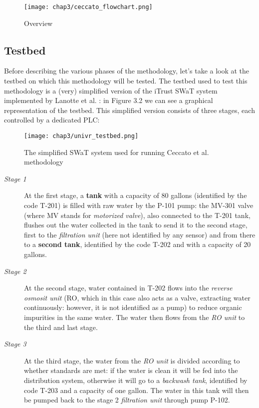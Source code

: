 \begin{figure}[ht]
	\centering
	\texttt{[image: chap3/ceccato\_flowchart.png]}
	\caption{Overview}
	\label{fig:ceccato_overview}
\end{figure}

\subsection{Testbed}
\label{subsec:ceccato_testbed}
Before describing the various phases of the methodology, let's take a look at the testbed on which this methodology will be tested. The testbed used to test this methodology is a (very) simplified version of the iTrust SWaT system \cite{swat_home} implemented by Lanotte et al. \cite{lanotte_et_al}: in Figure 3.2 we can see a graphical representation of the testbed. This simplified version consists of three stages, each controlled by a dedicated PLC: 

\begin{figure}[ht]
	\centering
	\texttt{[image: chap3/univr\_testbed.png]}
	\caption{The simplified SWaT system used for running Ceccato et al. methodology}
	\label{fig:univr_testbed}
\end{figure}

\bigskip
\begin{description}
	\item[\textit{Stage 1}] At the first stage, a \textbf{tank} with a capacity of 80 gallons (identified by the code T-201) is filled with raw water by the P-101 pump: the MV-301 valve (where MV stands for \textit{motorized valve}), also connected to the T-201 tank, flushes out the water collected in the tank to send it to the second stage, first to the \textit{filtration unit} (here not identified by any sensor) and from there to a \textbf{second tank}, identified by the code T-202 and with a capacity of 20 gallons.
	
	\item[\textit{Stage 2}] At the second stage, water contained in T-202 flows into the \textit{reverse osmosit unit} (RO, which in this case also acts as a valve, extracting water continuously: however, it is not identified as a pump) to reduce organic impurities in the same water. The water then flows from the \textit{RO unit} to the third and last stage.
	
	\item[\textit{Stage 3}] At the third stage, the water from the \textit{RO unit} is divided according to whether standards are met: if the water is clean it will be fed into the distribution system, otherwise it will go to a \textit{backwash tank}, identified by code T-203 and a capacity of one gallon. The water in this tank will then be pumped back to the stage 2 \textit{filtration unit} through pump P-102.
\end{description}

